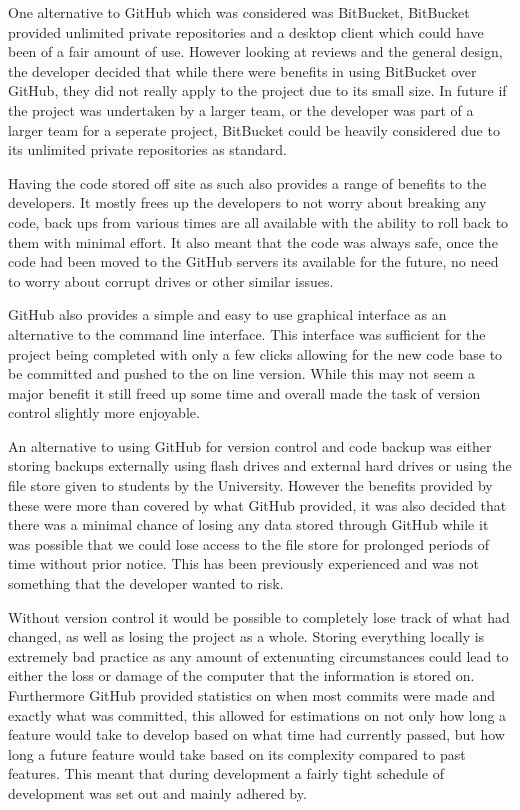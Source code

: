 One alternative to GitHub which was considered was BitBucket, BitBucket provided unlimited private repositories and a desktop client which could have been of a fair amount of use. However looking at reviews and the general design, the developer decided that while there were benefits in using BitBucket over GitHub, they did not really apply to the project due to its small size. In future if the project was undertaken by a larger team, or the developer was part of a larger team for a seperate project, BitBucket could be heavily considered due to its unlimited private repositories as standard. 

Having the code stored off site as such also provides a range of benefits to the developers. It mostly frees up the developers to not worry about breaking any code, back ups from various times are all available with the ability to roll back to them with minimal effort. It also meant that the code was always safe, once the code had been moved to the GitHub servers its available for the future, no need to worry about corrupt drives or other similar issues. 

GitHub also provides a simple and easy to use graphical interface as an alternative to the command line interface. This interface was sufficient for the project being completed with only a few clicks allowing for the new code base to be committed and pushed to the on line version. While this may not seem a major benefit it still freed up some time and overall made the task of version control slightly more enjoyable. 

An alternative to using GitHub for version control and code backup was either storing backups externally using flash drives and external hard drives or using the file store given to students by the University. However the benefits provided by these were more than covered by what GitHub provided, it was also decided that there was a minimal chance of losing any data stored through GitHub while it was possible that we could lose access to the file store for prolonged periods of time without prior notice. This has been previously experienced and was not something that the developer wanted to risk.

Without version control it would be possible to completely lose track of what had changed, as well as losing the project as a whole. Storing everything locally is extremely bad practice as any amount of extenuating circumstances could lead to either the loss or damage of the computer that the information is stored on. Furthermore GitHub provided statistics on when most commits were made and exactly what was committed, this allowed for estimations on not only how long a feature would take to develop based on what time had currently passed, but how long a future feature would take based on its complexity compared to past features. This meant that during development a fairly tight schedule of development was set out and mainly adhered by.
